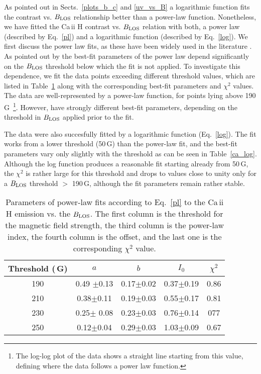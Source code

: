 \documentclass[goettingen, gauss, print]{thesis}
\begin{document}
As pointed out in Sects.~\ref{plots_b_c} and \ref{uv_vs_B} a logarithmic function fits the contrast vs. $B_{\rm LOS}$ relationship better than a power-law function. Nonetheless, we have fitted the  Ca\,{\sc ii} H contrast vs. $B_{\rm LOS}$ relation with both, a power law (described by Eq.~\ref{pl}) and a logarithmic function (described by Eq.~\ref{log}). We first discuss the power law fits, as these have been widely used in the literature \citep[e.g.,][]{schrijver_relations_1989,ortiz_how_2005,rezaei_relation_2007,loukitcheva_relationship_2009}. 
As pointed out by \cite{rezaei_relation_2007} the best-fit parameters of the power law depend significantly on the $B_{\rm LOS}$ threshold below which the fit is not applied. To investigate this dependence, we fit the data points exceeding different threshold values, which are listed in Table~\ref{ca_pl} along with the corresponding best-fit parameters and $\chi^2$ values. The data are well-represented by a power-law function, for points lying above 190\,G~\footnote{The log-log plot of the data shows a straight line starting from this value, defining where the data follows a power law function.}. However, have strongly different best-fit parameters, depending on the threshold in $B_{\rm LOS}$ applied prior to the fit.


The data were also succesfully fitted by a logarithmic function (Eq.~\ref{log}). The fit works from a lower threshold (50\,G) than the power-law fit, and the best-fit parameters vary only slightly with the threshold as can be seen in Table~\ref{ca_log}. Although the log function produces a reasonable fit starting already from 50\,G, the $\chi^2$ is rather large for this threshold and drops to values close to unity only for a $B_{\rm LOS}$ threshold $>$ 190\,G, although the fit parameters remain rather stable. 
\\

\begin{table}[h!]
\centering
\caption{Parameters of power-law fits according to Eq.~\ref{pl} to the Ca\,{\sc ii} H emission vs. the $B_{\rm LOS}$. The first column is the threshold for the magnetic field strength, the third column is the power-law index, the fourth column is the offset, and the last one is the corresponding $\chi^2$ value.}
\begin{tabular}{||ccccc||}
\hline
Threshold (\,G) & $a$  &$b$ &$I_0$ & $\chi^2$ \\
\hline\hline
190 & 0.49 $\pm$0.13&0.17$\pm$0.02&0.37$\pm$0.19&0.86\\
210 & 0.38$\pm$0.11&0.19$\pm$0.03&0.55$\pm$0.17&0.81\\
230 & 0.25$\pm$ 0.08&0.23$\pm$0.03&0.76$\pm$0.14&077\\
250 & 0.12$\pm$0.04&0.29$\pm$0.03&1.03$\pm$0.09&0.67\\
\hline
\end{tabular}
\label{ca_pl}

\end{table}
\end{document}
